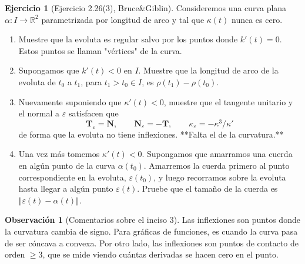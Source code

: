\documentclass[spanish]{book}
\theoremstyle{definition}
\newtheorem*{obs}{Observación}
\newtheorem*{ejer}{Ejercicio}
\newcommand{\R}{\mathbb{R}}
\begin{document}
\begin{ejer}[Ejercicio 2.26(3), Bruce\&Giblin]
	Consideremos una curva plana $\alpha:I\to\R^2$ parametrizada por longitud de arco y tal que $\kappa(t)$ nunca es cero.
	\begin{enumerate}
		\item Muestre que la evoluta es regular salvo por los puntos donde $k'(t)=0$. Estos puntos se llaman "vértices" de la curva.
		\item Supongamos que $k'(t)<0$ en $I$. Muestre que la longitud de arco de la evoluta de $t_0$ a $t_1$, para $t_1>t_0\in I$, es $\rho(t_1)-\rho(t_0)$.
		\item Nuevamente suponiendo que $\kappa'(t)<0$, muestre que el tangente unitario y el normal a $\varepsilon$ satisfacen que
		\[\mathbf{T}_\varepsilon=\mathbf{N},\qquad\mathbf{N}_\varepsilon=-\mathbf{T},\qquad \kappa_\varepsilon=-\kappa^3/\kappa'\]
 		de forma que la evoluta no tiene inflexiones. **Falta el de la curvatura.**
 		\item Una vez más tomemos $\kappa'(t)<0$. Supongamos que amarramos una cuerda en algún punto de la curva $\alpha(t_0)$. Amarremos la cuerda primero al punto correspondiente en la evoluta, $\varepsilon(t_0)$, y luego recorramos sobre la evoluta hasta llegar a algún punto $\varepsilon(t)$. Pruebe que el tamaño de la cuerda es $\Vert \varepsilon(t)-\alpha(t)\Vert$.
	\end{enumerate}
\end{ejer}
\begin{obs}[Comentarios sobre el inciso 3]
	Las inflexiones son puntos donde la curvatura cambia de signo. Para gráficas de funciones, es cuando la curva pasa de ser cóncava a convexa. Por otro lado, las inflexiones son puntos de contacto de orden $\geq3$, que se mide viendo cuántas derivadas se hacen cero en el punto.
\end{obs}
\end{document}
